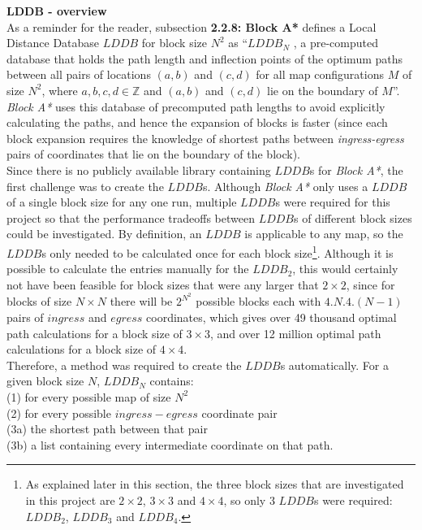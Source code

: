 \documentclass[12pt,notitlepage]{report}
\begin{document}
\noindent
{\bfseries LDDB - overview}\\
\noindent
As a reminder for the reader, subsection {\bfseries 2.2.8: Block A*} defines a Local Distance Database $LDDB$ for block size $N^{2}$ as ``$LDDB_{N}$ , a pre-computed database that holds the path length and inflection points of the optimum paths between all pairs of locations $(a,b)$ and $(c,d)$ for all map configurations $M$ of size $N^{2}$, where $a,b,c,d \in \mathbb{Z}$ and $(a,b)$ and $(c,d)$ lie on the boundary of $M$''. {\em Block A*} uses this database of precomputed path lengths to avoid explicitly calculating the paths, and hence the expansion of blocks is faster (since each block expansion requires the knowledge of shortest paths between {\em ingress-egress} pairs of coordinates that lie on the boundary of the block).\\

\noindent
Since there is no publicly available library containing $LDDB$s for {\em Block A*}, the first challenge was to create the $LDDB$s. Although {\em Block A*} only uses a $LDDB$ of a single block size for any one run, multiple $LDDB$s were required for this project so that the performance tradeoffs between $LDDB$s of different block sizes could be investigated. By definition, an $LDDB$ is applicable to any map, so the $LDDB$s only needed to be calculated once for each block size\footnote{As explained later in this section, the three block sizes that are investigated in this project are $2 \times 2$, $3 \times 3$ and $4 \times 4$, so only 3 $LDDB$s were required: $LDDB_{2}$, $LDDB_{3}$ and $LDDB_{4}$.}. Although it is possible to calculate the entries manually for the $LDDB_{2}$, this would certainly not have been feasible for block sizes that were any larger that $2 \times 2$, since for blocks of size {$N \times N$} there will be $2^{N^{2}}$ possible blocks each with $4.N.4.(N-1)$ pairs of $ingress$ and $egress$ coordinates, which gives over 49 thousand optimal path calculations for a block size of $3 \times 3$, and over 12 million optimal path calculations for a block size of $4 \times 4$.\\

\noindent
Therefore, a method was required to create the $LDDB$s automatically. For a given block size $N$, $LDDB_{N}$ contains:\\
(1) \indent for every possible map of size $N^{2}$\\
(2) \indent \indent for every possible $ingress-egress$ coordinate pair\\
(3a) \indent \indent \indent the shortest path between that pair\\
(3b) \indent \indent \indent a list containing every intermediate coordinate on that path.\\
\end{document}
